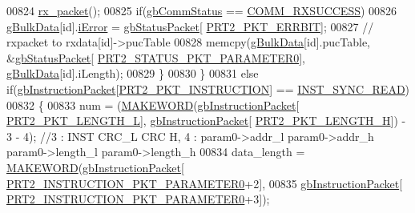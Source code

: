 \begin{DoxyCode}
00824                 \hyperlink{classdynamixel2_a7ca03821f030981263c55f2ae2786c4c}{rx\_packet}();
00825                 \textcolor{keywordflow}{if}(\hyperlink{classdynamixel2_a703e327ba8ec5909c238dc94a00cb32d}{gbCommStatus} == \hyperlink{dynamixel_8h_a171328d9f298535c18d079f65e631434}{COMM\_RXSUCCESS})
00826                     \hyperlink{classdynamixel2_a5083923283d17a820b3deb940c7211a5}{gBulkData}[id].\hyperlink{structdynamixel2_1_1data_a1c974bc78558d2a55f9a7c647cbb36f5}{iError} = \hyperlink{classdynamixel2_a0776f210a190cf57d1a6faf9697a593d}{gbStatusPacket}[
      \hyperlink{dynamixel_8h_a3bb6395e5d1d539b3027a16120f7c337}{PRT2\_PKT\_ERRBIT}];
00827                 \textcolor{comment}{// rxpacket to rxdata[id]->pucTable}
00828                 memcpy(\hyperlink{classdynamixel2_a5083923283d17a820b3deb940c7211a5}{gBulkData}[\textcolor{keywordtype}{id}].pucTable, &\hyperlink{classdynamixel2_a0776f210a190cf57d1a6faf9697a593d}{gbStatusPacket}[
      \hyperlink{dynamixel_8h_a7c79167a35ad785b57c7c8de66c59e5c}{PRT2\_STATUS\_PKT\_PARAMETER0}], \hyperlink{classdynamixel2_a5083923283d17a820b3deb940c7211a5}{gBulkData}[\textcolor{keywordtype}{id}].iLength);
00829             \}
00830         \}
00831         \textcolor{keywordflow}{else} \textcolor{keywordflow}{if}(\hyperlink{classdynamixel2_a298efe9115fdbf77019af1001e801fb4}{gbInstructionPacket}[\hyperlink{dynamixel_8h_aece9dd9d7c0fa1714d53c568865d79ad}{PRT2\_PKT\_INSTRUCTION}] == 
      \hyperlink{dynamixel_8h_a2c0994e6f77bcf585d7dfde88c10441f}{INST\_SYNC\_READ})
00832         \{
00833             num = (\hyperlink{dynamixel_8h_a6b98c16b8e3e7733dd4063d0b0fac24c}{MAKEWORD}(\hyperlink{classdynamixel2_a298efe9115fdbf77019af1001e801fb4}{gbInstructionPacket}[
      \hyperlink{dynamixel_8h_a9e77ab568957b64786c810967dec8b0c}{PRT2\_PKT\_LENGTH\_L}], \hyperlink{classdynamixel2_a298efe9115fdbf77019af1001e801fb4}{gbInstructionPacket}[
      \hyperlink{dynamixel_8h_a5ea18a21d722bf72217d5408c4d2a868}{PRT2\_PKT\_LENGTH\_H}]) - 3 - 4); \textcolor{comment}{//3 : INST  CRC\_L CRC H, 4 : param0->addr\_l param0->addr\_h
       param0->length\_l param0->length\_h }
00834             data\_length = \hyperlink{dynamixel_8h_a6b98c16b8e3e7733dd4063d0b0fac24c}{MAKEWORD}(\hyperlink{classdynamixel2_a298efe9115fdbf77019af1001e801fb4}{gbInstructionPacket}[
      \hyperlink{dynamixel_8h_a349ccb89ae957bdcc16856ec8e2dcb00}{PRT2\_INSTRUCTION\_PKT\_PARAMETER0}+2], 
00835                 \hyperlink{classdynamixel2_a298efe9115fdbf77019af1001e801fb4}{gbInstructionPacket}[
      \hyperlink{dynamixel_8h_a349ccb89ae957bdcc16856ec8e2dcb00}{PRT2\_INSTRUCTION\_PKT\_PARAMETER0}+3]);

\end{DoxyCode}
